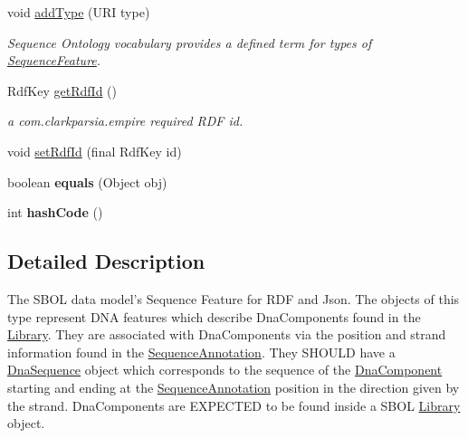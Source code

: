 \begin{DoxyCompactItemize}
void \hyperlink{classorg_1_1sbolstandard_1_1lib_s_b_o_lj_1_1_sequence_feature_ae714b030621449e61274bdb84a09c0fb}{addType} (URI type)
\begin{DoxyCompactList}\small\item\em Sequence Ontology vocabulary provides a defined term for types of \hyperlink{classorg_1_1sbolstandard_1_1lib_s_b_o_lj_1_1_sequence_feature}{SequenceFeature}. \item\end{DoxyCompactList}\item 
RdfKey \hyperlink{classorg_1_1sbolstandard_1_1lib_s_b_o_lj_1_1_sequence_feature_a6fd7acfe199c9c10f6f415a95254e64c}{getRdfId} ()
\begin{DoxyCompactList}\small\item\em a com.clarkparsia.empire required RDF id. \item\end{DoxyCompactList}\item 
void \hyperlink{classorg_1_1sbolstandard_1_1lib_s_b_o_lj_1_1_sequence_feature_a1f7950ca9962cf04e766100c0c55e1ea}{setRdfId} (final RdfKey id)
\item 
\hypertarget{classorg_1_1sbolstandard_1_1lib_s_b_o_lj_1_1_sequence_feature_ab69bb28a8ebfa140726fb44f4d4ae64b}{
boolean {\bfseries equals} (Object obj)}
\label{classorg_1_1sbolstandard_1_1lib_s_b_o_lj_1_1_sequence_feature_ab69bb28a8ebfa140726fb44f4d4ae64b}

\item 
\hypertarget{classorg_1_1sbolstandard_1_1lib_s_b_o_lj_1_1_sequence_feature_a529b5fa19deb681e79204e08aa5b2725}{
int {\bfseries hashCode} ()}
\label{classorg_1_1sbolstandard_1_1lib_s_b_o_lj_1_1_sequence_feature_a529b5fa19deb681e79204e08aa5b2725}

\end{DoxyCompactItemize}


\subsection{Detailed Description}
The SBOL data model's Sequence Feature for RDF and Json. The objects of this type represent DNA features which describe DnaComponents found in the \hyperlink{classorg_1_1sbolstandard_1_1lib_s_b_o_lj_1_1_library}{Library}. They are associated with DnaComponents via the position and strand information found in the \hyperlink{classorg_1_1sbolstandard_1_1lib_s_b_o_lj_1_1_sequence_annotation}{SequenceAnnotation}. They SHOULD have a \hyperlink{classorg_1_1sbolstandard_1_1lib_s_b_o_lj_1_1_dna_sequence}{DnaSequence} object which corresponds to the sequence of the \hyperlink{classorg_1_1sbolstandard_1_1lib_s_b_o_lj_1_1_dna_component}{DnaComponent} starting and ending at the \hyperlink{classorg_1_1sbolstandard_1_1lib_s_b_o_lj_1_1_sequence_annotation}{SequenceAnnotation} position in the direction given by the strand. DnaComponents are EXPECTED to be found inside a SBOL \hyperlink{classorg_1_1sbolstandard_1_1lib_s_b_o_lj_1_1_library}{Library} object.

